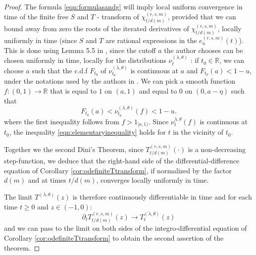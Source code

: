 \documentclass[12pt,reqno]{amsart}
\begin{document}
\begin{proof}
The formula \eqref{eqn:formulasandg} will imply local uniform convergence in time of the finite free $S$ and $T$ - transform of $\chi_{t/d(m)}^{(r,s,m)}$, provided that we can bound away from zero the roots of the iterated derivatives of $\chi_{t/d(m)}^{(r,s,m)}$, locally uniformly in time (since $S$ and $T$ are rational expressions in the $e_n^{(r,s,m)}(t)$). 
This is done using Lemma 5.5 in \cite{arizmendi2024s}, since the cutoff $a$ the author chooses can be chosen uniformly in time, locally for the distributions $\nu_t^{(\lambda,\theta)}$ : if $t_0 \in \mathbb{R}$, we can choose $a$ such that the c.d.f $F_{t_0}$ of $\nu^{(\lambda,\theta)}_{t_0}$ is continuous at $a$ and $F_{t_0}(a) < 1-u$, under the notations used by the authors in \cite{arizmendi2024s}. We can pick a smooth function $f:(0,1)\to\mathbb{R}$ that is equal to $1$ on $(a,1)$ and equal to $0$ on $(0,a-\eta)$ such that 
\begin{equation}
\label{eqn:elementaryinequality}
F_{t_0}(a) < \nu^{(\lambda,\theta)}_{t_0}(f) < 1-u.
\end{equation}
where the first inequality follows from $f > 1_{[a,1)}$. Since $\nu_{t}^{\lambda,\theta}(f)$ is continuous at $t_0$, the inequality \ref{eqn:elementaryinequality}
holds for $t$ in the vicinity of $t_0$.

Together we the second Dini's Theorem, since $T_{t/d(m)}^{(r,s,m)}(\cdot)$ is a non-decreasing step-function, we deduce that the right-hand side of the differential-difference equation of Corollary \ref{cor:odefiniteTtransform}, if normalized by the factor $d(m)$ and at times $t/d(m)$, converges locally uniformly in time.



The limit $T^{(\lambda,\theta)}(z)$ is therefore continuously differentiable in time and for each time $t\geq 0$ and $z \in (-1,0)$:
$$
\partial_t T^{(r,s,m)}_{t/d(m)}(z) \rightarrow T^{(\lambda,\theta)}_t(z)
$$
and we can pass to the limit on both sides of the integro-differential equation of Corollary \ref{cor:odefiniteTtransform} to obtain the second assertion of the theorem. 
\end{proof}
\printbibliography
\end{document}
